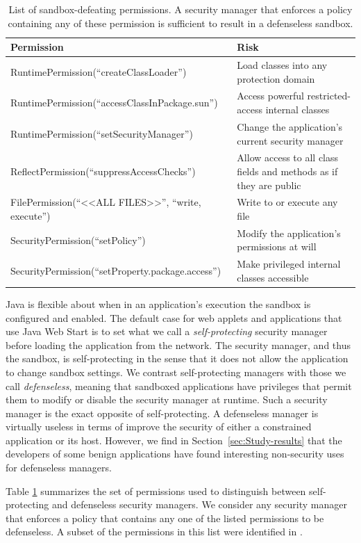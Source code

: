 \documentclass{sig-alternate}
\begin{document}
\begin{table}
\caption{List of sandbox-defeating permissions. A security manager that enforces
a policy containing any of these permission is sufficient to result
\label{tab:defenseless-permissions}
in a defenseless sandbox.}


\centering{}%
\begin{tabular}{ll}
\toprule 
\textbf{Permission} & \textbf{Risk}\tabularnewline
\midrule
RuntimePermission(``createClassLoader'') & Load classes into any protection domain\tabularnewline
RuntimePermission(``accessClassInPackage.sun'') & Access powerful restricted-access internal classes\tabularnewline
RuntimePermission(``setSecurityManager'') & Change the application's current security manager\tabularnewline
ReflectPermission(``suppressAccessChecks'') & Allow access to all class fields and methods as if they are public\tabularnewline
FilePermission(``<\textcompwordmark{}<ALL FILES>\textcompwordmark{}>'',
``write, execute'') & Write to or execute any file\tabularnewline
SecurityPermission(``setPolicy'') & Modify the application's permissions at will\tabularnewline
SecurityPermission(``setProperty.package.access'') & Make privileged internal classes accessible\tabularnewline
\bottomrule
\end{tabular}
\end{table}


 Java is flexible about when in an application's execution the sandbox
is configured and enabled. The default case for web applets and applications
that use Java Web Start is to set what we call a \textit{self-protecting} security
manager before loading the application from the network. The security
manager, and thus the sandbox, is self-protecting in the sense that
it does not allow the application to change sandbox settings. We contrast
self-protecting managers with those we call 
\textit{defenseless}, meaning that sandboxed applications have privileges that
permit them to modify or disable the security manager at runtime.  Such a
security manager is the exact opposite
of self-protecting. A defenseless manager is virtually useless in terms of improve the
security of either a constrained application or its host. However, we find
in Section~\ref{sec:Study-results} that the developers of some benign applications
have found interesting non-security uses for defenseless managers. 

Table \ref{tab:defenseless-permissions} summarizes the set of permissions
used to distinguish between self-protecting and defenseless security
managers. We consider any security manager that enforces a policy
that contains any one of the listed permissions to be defenseless.
A subset of the permissions in this list were identified in \cite{security_explorations_2012}. 
\end{document}
